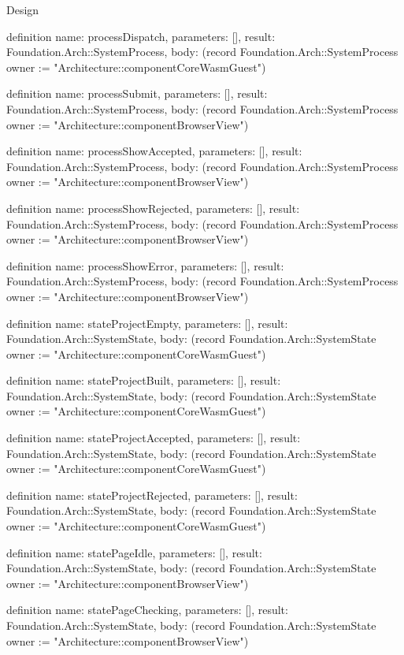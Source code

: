 \begin{lexlean}{Design}
\begin{semanticmodule}
definition{
  name: processDispatch,
  parameters: [],
  result: Foundation.Arch::SystemProcess,
  body: (record Foundation.Arch::SystemProcess {owner := "Architecture::componentCoreWasmGuest"})
}

definition{
  name: processSubmit,
  parameters: [],
  result: Foundation.Arch::SystemProcess,
  body: (record Foundation.Arch::SystemProcess {owner := "Architecture::componentBrowserView"})
}

definition{
  name: processShowAccepted,
  parameters: [],
  result: Foundation.Arch::SystemProcess,
  body: (record Foundation.Arch::SystemProcess {owner := "Architecture::componentBrowserView"})
}

definition{
  name: processShowRejected,
  parameters: [],
  result: Foundation.Arch::SystemProcess,
  body: (record Foundation.Arch::SystemProcess {owner := "Architecture::componentBrowserView"})
}

definition{
  name: processShowError,
  parameters: [],
  result: Foundation.Arch::SystemProcess,
  body: (record Foundation.Arch::SystemProcess {owner := "Architecture::componentBrowserView"})
}

definition{
  name: stateProjectEmpty,
  parameters: [],
  result: Foundation.Arch::SystemState,
  body: (record Foundation.Arch::SystemState {owner := "Architecture::componentCoreWasmGuest"})
}

definition{
  name: stateProjectBuilt,
  parameters: [],
  result: Foundation.Arch::SystemState,
  body: (record Foundation.Arch::SystemState {owner := "Architecture::componentCoreWasmGuest"})
}

definition{
  name: stateProjectAccepted,
  parameters: [],
  result: Foundation.Arch::SystemState,
  body: (record Foundation.Arch::SystemState {owner := "Architecture::componentCoreWasmGuest"})
}

definition{
  name: stateProjectRejected,
  parameters: [],
  result: Foundation.Arch::SystemState,
  body: (record Foundation.Arch::SystemState {owner := "Architecture::componentCoreWasmGuest"})
}

definition{
  name: statePageIdle,
  parameters: [],
  result: Foundation.Arch::SystemState,
  body: (record Foundation.Arch::SystemState {owner := "Architecture::componentBrowserView"})
}

definition{
  name: statePageChecking,
  parameters: [],
  result: Foundation.Arch::SystemState,
  body: (record Foundation.Arch::SystemState {owner := "Architecture::componentBrowserView"})
}


\end{semanticmodule}
\end{lexlean}
